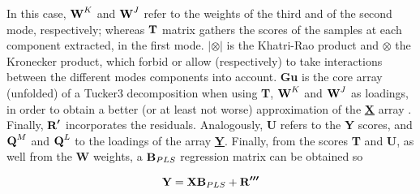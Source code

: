 In this case, $\textbf{\text{W}}^{K}$ and $\textbf{\text{W}}^{J}$ refer to the weights of the third and of the second mode, respectively; whereas $\textbf{\text{T}}$ matrix gathers the scores of the samples at each component extracted, in the first mode. $|\otimes{}|$ is the Khatri-Rao product and $\otimes{}$ the Kronecker product, which forbid or allow (respectively) to take interactions between the different modes components into account. 
\textbf{Gu} is the core array (unfolded) of a Tucker3 decomposition when using \textbf{T}, $\textbf{\text{W}}^{K}$ and $\textbf{\text{W}}^{J}$ as loadings, in order to obtain a better (or at least not worse) approximation of the \textbf{\underline{X}} array \parencite{smilde2005multi}. Finally, $\textbf{\text{R}}^{\boldsymbol{\prime{}}}$ incorporates the residuals. Analogously, \textbf{U} refers to the \textbf{Y} scores, and $\textbf{\text{Q}}^{M}$ and $\textbf{\text{Q}}^{L}$ to the loadings of the array \textbf{\underline{Y}}.
Finally, from the scores \textbf{T} and \textbf{U}, as well from the \textbf{W} weights, a $\textbf{\text{B}}_{PLS}$ regression matrix can be obtained \parencite{bro1998multi} so

\begin{equation}
\textbf{\text{Y}}=\textbf{\text{X}}\textbf{\text{B}}_{PLS}+\textbf{\text{R}}^{\boldsymbol{\prime{}\prime{}\prime{}}}
\label{equation04}
\end{equation}

